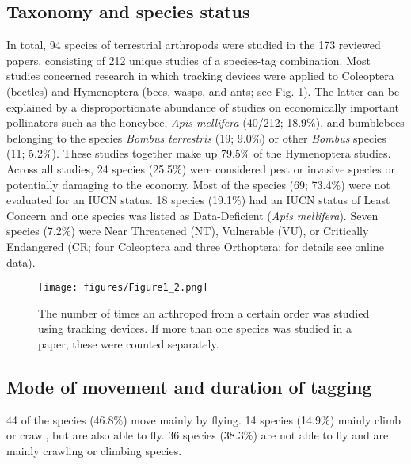 \documentclass[10pt, twoside]{book} %
\begin{document}
\subsection{Taxonomy and species status}
	In total, 94 species of terrestrial arthropods were studied in the 173 reviewed papers, consisting of 212 unique studies of a species-tag combination. Most studies concerned research in which tracking devices were applied to Coleoptera (beetles) and Hymenoptera (bees, wasps, and ants; see Fig. \ref{fig1.2}). The latter can be explained by a disproportionate abundance of studies on economically important pollinators such as the honeybee, \textit{Apis mellifera} (40/212; 18.9$\%$), and bumblebees belonging to the species \textit{Bombus terrestris} (19; 9.0$\%$) or other \textit{Bombus} species (11; 5.2$\%$). These studies together make up 79.5$\%$ of the Hymenoptera studies. Across all studies, 24 species (25.5$\%$) were considered pest or invasive species or potentially damaging to the economy. Most of the species (69; 73.4$\%$) were not evaluated for an IUCN status. 18 species (19.1$\%$) had an IUCN status of Least Concern and one species was listed as Data-Deficient (\textit{Apis mellifera}). Seven species (7.2$\%$) were Near Threatened (NT), Vulnerable (VU), or Critically Endangered (CR; four Coleoptera and three Orthoptera; for details see online data).\\
	
	\begin{figure}[hb!]
		\begin{center}
			\texttt{[image: figures/Figure1\_2.png]}
		\end{center}
		\begin{footnotesize}
			\caption{The number of times an arthropod from a certain order was studied using tracking devices. If more than one species was studied in a paper, these were counted separately. \label{fig1.2}}
		\end{footnotesize}
	\end{figure}

	\subsection{Mode of movement and duration of tagging}
44 of the species (46.8$\%$) move mainly by flying. 14 species (14.9$\%$) mainly climb or crawl, but are also able to fly. 36 species (38.3$\%$) are not able to fly and are mainly crawling or climbing species.\\
\end{document}
